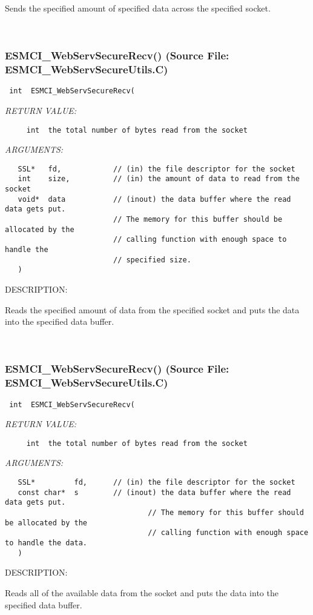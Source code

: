       Sends the specified amount of specified data across the specified
      socket.
   
 
\mbox{}\hrulefill\
 
\subsubsection{ESMCI\_WebServSecureRecv() (Source File: ESMCI\_WebServSecureUtils.C)}


  
\begin{verbatim} int  ESMCI_WebServSecureRecv(\end{verbatim}{\em RETURN VALUE:}
\begin{verbatim}     int  the total number of bytes read from the socket\end{verbatim}{\em ARGUMENTS:}
\begin{verbatim}   SSL*   fd,            // (in) the file descriptor for the socket
   int    size,          // (in) the amount of data to read from the socket
   void*  data           // (inout) the data buffer where the read data gets put.
                         // The memory for this buffer should be allocated by the
                         // calling function with enough space to handle the
                         // specified size.
   )\end{verbatim}
{\sf DESCRIPTION:\\ }


      Reads the specified amount of data from the specified socket and
      puts the data into the specified data buffer.
   
 
\mbox{}\hrulefill\
 
\subsubsection{ESMCI\_WebServSecureRecv() (Source File: ESMCI\_WebServSecureUtils.C)}


  
\begin{verbatim} int  ESMCI_WebServSecureRecv(\end{verbatim}{\em RETURN VALUE:}
\begin{verbatim}     int  the total number of bytes read from the socket\end{verbatim}{\em ARGUMENTS:}
\begin{verbatim}   SSL*         fd,      // (in) the file descriptor for the socket
   const char*  s        // (inout) the data buffer where the read data gets put.
                                 // The memory for this buffer should be allocated by the
                                 // calling function with enough space to handle the data.
   )\end{verbatim}
{\sf DESCRIPTION:\\ }


      Reads all of the available data from the socket and puts the data
      into the specified data buffer.
  
\setlength{\parskip}{\oldparskip}
\setlength{\parindent}{\oldparindent}
\setlength{\baselineskip}{\oldbaselineskip}
